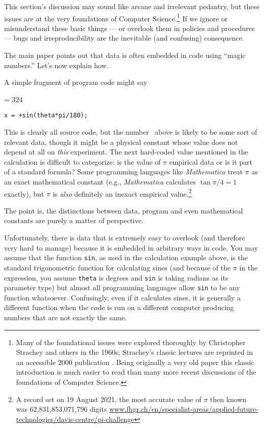 \documentclass[10pt,a4paper]{article}
\begin{document}
This section's discussion may sound like arcane and irrelevant pedantry, but these issues are at the very foundations of Computer Science.\footnote{{Many of the foundational issues were explored thoroughly by Christopher Strachey and others in the 1960s; Strachey's classic lectures are reprinted in an accessible 2000 publication \cite{strachey}. Being originally a very old paper this classic introduction is much easier to read than many more recent discussions of the foundations of Computer Science.}} If we ignore or misunderstand these basic things --- or overlook them in policies and procedures --- bugs and irreproducibility are the inevitable (and confusing) consequence.

The main paper points out that data is often embedded in code using ``magic numbers.'' Let's now explain how. 

A simple fragment of program code might say

\newcount \magicNumber \magicNumber = 324
\begin{center}\texttt{x = \the\magicNumber+sin(theta*pi/180);}\end{center}

This is clearly all source code, but the number \the\magicNumber\ above is likely to be some sort of relevant data, though it might be a physical constant whose value does not depend at all on \emph{this\/} experiment. The next hard-coded value mentioned in the calculation is difficult to categorize: is the value of $\pi$ empirical data or is it part of a standard formula? Some programming languages like \emph{Mathematica\/} treat $\pi$ as an exact mathematical constant (e.g., \emph{Mathematica\/} calculates $\tan\pi/4 = 1$ exactly), but $\pi$ is \emph{also\/} definitely an inexact empirical value.\footnote{A record set on 19 August 2021, the most accurate value of $\pi$ then known was 62,831,853,071,796 digits %
\url{www.fhgr.ch/en/specialist-areas/applied-future-technologies/davis-centre/pi-challenge}} 

The point is, the distinctions between data, program and even mathematical constants are purely a matter of perspective.

Unfortunately, there is data that is extremely easy to overlook (and therefore very hard to manage) because it is embedded in arbitrary ways in code. You may assume that the function \texttt{sin}, as used in the calculation example above, is the standard trigonometric function for calculating sines (and because of the $\pi$ in the expression, you assume \texttt{theta} is degrees and \texttt{sin} is taking radians as its parameter type) but almost all programming languages allow \texttt{sin} to be any function whatsoever. Confusingly, even if it calculates sines, it is generally a different function when the code is run on a different computer producing numbers that are not exactly the same.
\end{document}
